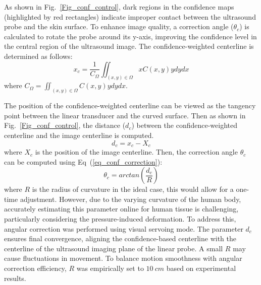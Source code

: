 \par
As shown in Fig.~\ref{Fig_conf_control}, dark regions in the confidence maps (highlighted by red rectangles) indicate improper contact between the ultrasound probe and the skin surface. To enhance image quality, a correction angle ($\theta_c$) is calculated to rotate the probe around its y-axis, improving the confidence level in the central region of the ultrasound image. The confidence-weighted centerline is determined as follows:
\begin{equation}
    x_c = \frac{1}{C_\Omega}\iint_{(x,y)\in\Omega}xC(x,y)ydydx
\end{equation}
where $C_{\Omega} = \iint_{(x,y)\in\Omega}C(x,y)ydydx$.
\par
The position of the confidence-weighted centerline can be viewed as the tangency point between the linear transducer and the curved surface. Then as shown in Fig.~\ref{Fig_conf_control}, the distance ($d_c$) between the confidence-weighted centerline and the image centerline is computed.
\begin{equation}\label{eq_d_c}
    d_c = x_c-X_{c}
\end{equation}
where $X_c$ is the position of the image centerline. Then, the correction angle $\theta_c$ can be computed using Eq~(\ref{eq_conf_correction}):
\begin{equation}\label{eq_conf_correction}
    \theta_c = arctan(\frac{d_c}{R})
\end{equation}
where $R$ is the radius of curvature in the ideal case, this would allow for a one-time adjustment. However, due to the varying curvature of the human body, accurately estimating this parameter online for human tissue is challenging, particularly considering the pressure-induced deformation. To address this, angular correction was performed using visual servoing mode. The parameter $d_c$ ensures final convergence, aligning the confidence-based centerline with the centerline of the ultrasound imaging plane of the linear probe. A small $R$ may cause fluctuations in movement. To balance motion smoothness with angular correction efficiency, $R$ was empirically set to $10~cm$ based on experimental results.

